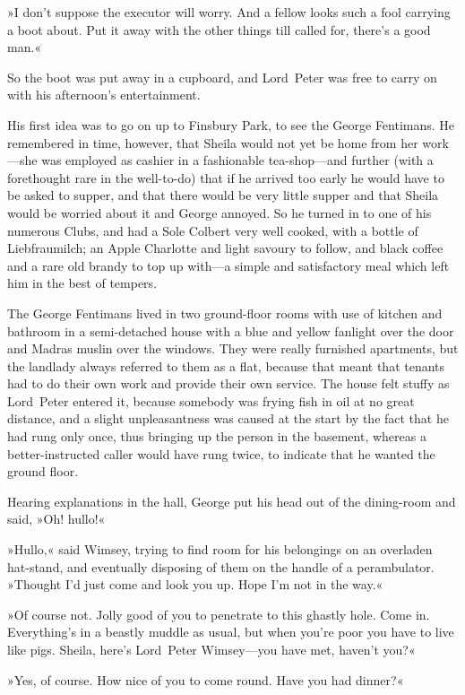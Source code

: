 »I don't suppose the executor will worry. And a fellow looks such a fool carrying a boot about. Put it away with the other things till called for, there's a good man.«

So the boot was put away in a cupboard, and Lord~Peter was free to carry on with his afternoon's entertainment.

His first idea was to go on up to Finsbury Park, to see the George Fentimans. He remembered in time, however, that Sheila would not yet be home from her work—she was employed as cashier in a fashionable tea-shop—and further (with a forethought rare in the well-to-do) that if he arrived too early he would have to be asked to supper, and that there would be very little supper and that Sheila would be worried about it and George annoyed. So he turned in to one of his numerous Clubs, and had a Sole Colbert very well cooked, with a bottle of Liebfraumilch; an Apple Charlotte and light savoury to follow, and black coffee and a rare old brandy to top up with—a simple and satisfactory meal which left him in the best of tempers.

The George Fentimans lived in two ground-floor rooms with use of kitchen and bathroom in a semi-detached house with a blue and yellow fanlight over the door and Madras muslin over the windows. They were really furnished apartments, but the landlady always referred to them as a flat, because that meant that tenants had to do their own work and provide their own service. The house felt stuffy as Lord~Peter entered it, because somebody was frying fish in oil at no great distance, and a slight unpleasantness was caused at the start by the fact that he had rung only once, thus bringing up the person in the basement, whereas a better-instructed caller would have rung twice, to indicate that he wanted the ground floor.

Hearing explanations in the hall, George put his head out of the dining-room and said, »Oh! hullo!«

»Hullo,« said Wimsey, trying to find room for his belongings on an overladen hat-stand, and eventually disposing of them on the handle of a perambulator. »Thought I'd just come and look you up. Hope I'm not in the way.«

»Of course not. Jolly good of you to penetrate to this ghastly hole. Come in. Everything's in a beastly muddle as usual, but when you're poor you have to live like pigs. Sheila, here's Lord~Peter Wimsey—you have met, haven't you?«

»Yes, of course. How nice of you to come round. Have you had dinner?«

